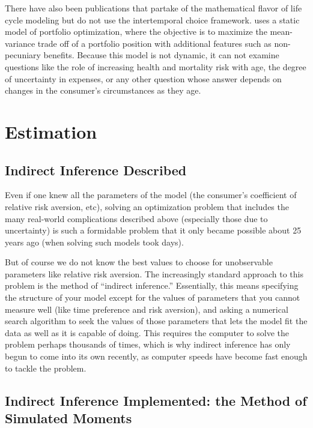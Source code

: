 \documentclass{article}
\begin{document}
There have also been publications that partake of the mathematical flavor of life cycle modeling but do not use the intertemporal choice framework.
\cite{Idzorek_2023} uses a static model of portfolio optimization, where the objective is to maximize the mean-variance trade off of a portfolio position with additional features such as non-pecuniary benefits.
Because this model is not dynamic, it can not examine questions like the role of increasing health and mortality risk with age, the degree of uncertainty in expenses, or any other question whose answer depends on changes in the consumer's circumstances as they age.

\section{Estimation}\label{estimation}

\subsection{Indirect Inference Described}

Even if one knew all the parameters of the model (the consumer's coefficient of relative risk aversion, etc), solving an optimization problem that includes the many real-world complications described above (especially those due to uncertainty) is such a formidable problem that it only became possible about 25 years ago (when solving such models took days).

But of course we do not know the best values to choose for unobservable parameters like relative risk aversion.
The increasingly standard approach to this problem is the method of ``indirect inference.''
Essentially, this means specifying the structure of your model except for the values of parameters that you cannot measure well (like time preference and risk aversion), and asking a numerical search algorithm to seek the values of those parameters that lets the model fit the data as well as it is capable of doing.
This requires the computer to solve the problem perhaps thousands of times, which is why indirect inference has only begun to come into its own recently, as computer speeds have become fast enough to tackle the problem.

\subsection{Indirect Inference Implemented: the Method of Simulated Moments}
\end{document}
